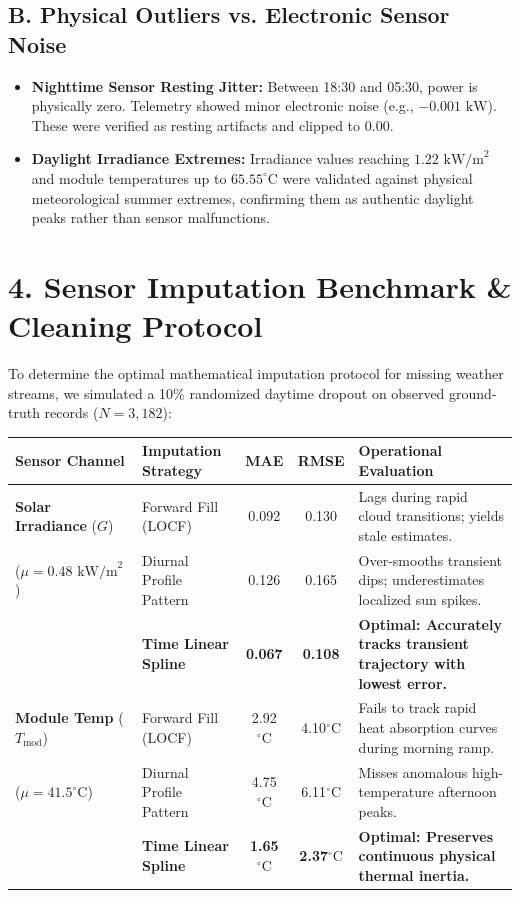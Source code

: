 \documentclass[10pt,a4paper]{article}
\begin{document}
\subsection*{B. Physical Outliers vs. Electronic Sensor Noise}
\begin{itemize}[leftmargin=14pt,itemsep=2pt,topsep=2pt,parsep=0pt]
    \item \textbf{Nighttime Sensor Resting Jitter:} Between 18:30 and 05:30, power is physically zero. Telemetry showed minor electronic noise (e.g., $-0.001\text{ kW}$). These were verified as resting artifacts and clipped to $0.00$.
    \item \textbf{Daylight Irradiance Extremes:} Irradiance values reaching $1.22\text{ kW/m}^2$ and module temperatures up to $65.55^\circ\text{C}$ were validated against physical meteorological summer extremes, confirming them as authentic daylight peaks rather than sensor malfunctions.
\end{itemize}

\section*{4. Sensor Imputation Benchmark \& Cleaning Protocol}
To determine the optimal mathematical imputation protocol for missing weather streams, we simulated a 10\% randomized daytime dropout on observed ground-truth records ($N=3,182$):

\vspace{3pt}
\begin{center}
\small
\begin{tabular}{@{}llccp{6.8cm}@{}}
\toprule
\textbf{Sensor Channel} & \textbf{Imputation Strategy} & \textbf{MAE} & \textbf{RMSE} & \textbf{Operational Evaluation} \\ \midrule
\textbf{Solar Irradiance} ($G$) & Forward Fill (LOCF) & 0.092 & 0.130 & Lags during rapid cloud transitions; yields stale estimates. \\
($\mu=0.48\text{ kW/m}^2$) & Diurnal Profile Pattern & 0.126 & 0.165 & Over-smooths transient dips; underestimates localized sun spikes. \\
& \textbf{Time Linear Spline} & \textbf{0.067} & \textbf{0.108} & \textbf{Optimal: Accurately tracks transient trajectory with lowest error.} \\ \midrule
\textbf{Module Temp} ($T_{\text{mod}}$) & Forward Fill (LOCF) & 2.92$^\circ\text{C}$ & 4.10$^\circ\text{C}$ & Fails to track rapid heat absorption curves during morning ramp. \\
($\mu=41.5^\circ\text{C}$) & Diurnal Profile Pattern & 4.75$^\circ\text{C}$ & 6.11$^\circ\text{C}$ & Misses anomalous high-temperature afternoon peaks. \\
& \textbf{Time Linear Spline} & \textbf{1.65$^\circ\text{C}$} & \textbf{2.37$^\circ\text{C}$} & \textbf{Optimal: Preserves continuous physical thermal inertia.} \\ \bottomrule
\end{tabular}
\end{center}
\vspace{1pt}
\end{document}
